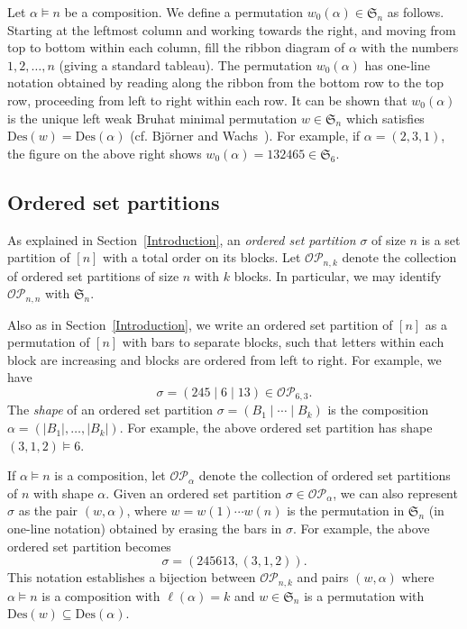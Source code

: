 \documentclass[ALCO,ThmDefs,published]{cedram}
\newcommand{\symm}{{\mathfrak{S}}}
\theoremstyle{plain}
\newcommand{\Des}{{\mathrm {Des}}}
\newcommand{\symm}{{\mathfrak{S}}}
\newcommand{\OP}{{\mathcal{OP}}}
\begin{document}
Let $\alpha \models n$ be a composition.  We define a permutation $w_0(\alpha) \in \symm_n$ as follows.
Starting at the leftmost column and working towards the right, and moving from top to bottom within each column, fill the 
ribbon diagram of $\alpha$ with the numbers $1, 2, \dots, n$ (giving a standard tableau).
The permutation $w_0(\alpha)$ has one-line notation obtained by reading along the ribbon from the bottom row to the top row, proceeding from left to right within each row.  
It can be shown that $w_0(\alpha)$ is the unique left weak Bruhat minimal permutation $w \in \symm_n$ which
satisfies $\Des(w) = \Des(\alpha)$ (cf. Bj\"orner and Wachs~\cite{BjornerWachs}).
For example, if $\alpha = (2,3,1)$, the figure on the above right
shows $w_0(\alpha) = 132465 \in \symm_6$.






\subsection{Ordered set partitions}
As explained in Section~\ref{Introduction},
an \emph{ordered set partition} $\sigma$ of size $n$ is a set partition of $[n]$ with a total order on its blocks.
Let $\OP_{n,k}$ denote the collection of ordered set 
partitions of size $n$ with $k$ blocks.  
In particular, we may identify $\OP_{n,n}$ with $\symm_n$.

Also as in Section~\ref{Introduction},
we write an ordered set partition of $[n]$ as a permutation of $[n]$ with bars to separate blocks, such that letters within each block are increasing and blocks are ordered from left to right.
For example, we have
\begin{equation*}
\sigma = (245 \mid 6 \mid 13) \in \OP_{6,3}.
\end{equation*}
The \emph{shape} of an ordered set partition $\sigma = (B_1 \mid \cdots \mid B_k)$ is
the composition $\alpha = (|B_1|, \dots, |B_k|)$.  For example, the above ordered set partition has shape $(3,1,2) \models 6$.

If $\alpha \models n$ is a composition, let $\OP_{\alpha}$ denote the collection of ordered set partitions of $n$ with shape $\alpha$.  
Given an ordered set partition $\sigma \in \OP_{\alpha}$, we can also represent $\sigma$ as the pair
$(w, \alpha)$, where $w = w(1) \cdots w(n)$ is the permutation in $\symm_n$ (in one-line notation) obtained by erasing 
the bars in $\sigma$.  For example, the above ordered set partition becomes
\begin{equation*}
\sigma = (245613, (3,1,2)).
\end{equation*}
This notation establishes a bijection between $\OP_{n,k}$ and pairs $(w, \alpha)$ where $\alpha \models n$ 
is a composition with $\ell(\alpha) = k$ and $w \in \symm_n$ is a permutation with $\Des(w) \subseteq \Des(\alpha)$.
\end{document}
